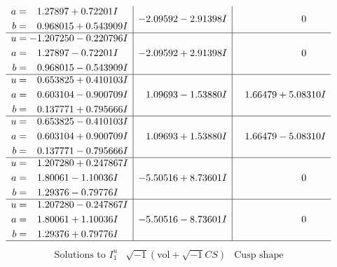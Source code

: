 \documentclass[1p]{elsarticle_modified}
\theoremstyle{definition}
\newcommand{\I}{\sqrt{-1}}
\begin{document}
$$\begin{array}{c|c|c}
\begin{aligned}
a &= \phantom{-}1.27897 + 0.72201 I \\
b &= \phantom{-}0.968015 + 0.543909 I\end{aligned}
 & -2.09592 - 2.91398 I & \phantom{-0.000000 } 0 \\ \hline\begin{aligned}
u &= -1.207250 - 0.220796 I \\
a &= \phantom{-}1.27897 - 0.72201 I \\
b &= \phantom{-}0.968015 - 0.543909 I\end{aligned}
 & -2.09592 + 2.91398 I & \phantom{-0.000000 } 0 \\ \hline\begin{aligned}
u &= \phantom{-}0.653825 + 0.410103 I \\
a &= \phantom{-}0.603104 - 0.900709 I \\
b &= \phantom{-}0.137771 + 0.795666 I\end{aligned}
 & \phantom{-}1.09693 - 1.53880 I & \phantom{-}1.66479 + 5.08310 I \\ \hline\begin{aligned}
u &= \phantom{-}0.653825 - 0.410103 I \\
a &= \phantom{-}0.603104 + 0.900709 I \\
b &= \phantom{-}0.137771 - 0.795666 I\end{aligned}
 & \phantom{-}1.09693 + 1.53880 I & \phantom{-}1.66479 - 5.08310 I \\ \hline\begin{aligned}
u &= \phantom{-}1.207280 + 0.247867 I \\
a &= \phantom{-}1.80061 - 1.10036 I \\
b &= \phantom{-}1.29376 - 0.79776 I\end{aligned}
 & -5.50516 + 8.73601 I & \phantom{-0.000000 } 0 \\ \hline\begin{aligned}
u &= \phantom{-}1.207280 - 0.247867 I \\
a &= \phantom{-}1.80061 + 1.10036 I \\
b &= \phantom{-}1.29376 + 0.79776 I\end{aligned}
 & -5.50516 - 8.73601 I & \phantom{-0.000000 } 0\\
 \hline 
 \end{array}$$\newpage$$\begin{array}{c|c|c}  
\text{Solutions to }I^u_{1}& \I (\text{vol} + \sqrt{-1}CS) & \text{Cusp shape}\\
 \hline 
\begin{aligned}

\end{aligned}
\end{array}$$
\end{document}
